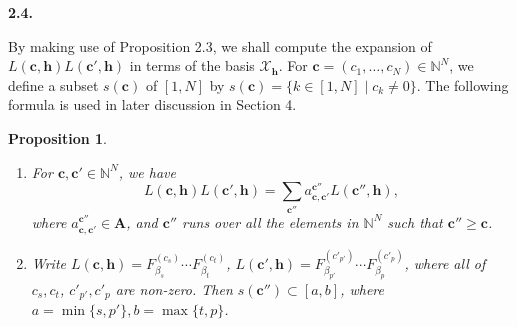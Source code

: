 \documentclass[12pt]{amsart}
\renewcommand\b{\beta}
\renewcommand{\1}{\mathbb 1}
\newcommand{\NN}{\mathbb N}
\newcommand\BA{\mathbf A}
\newcommand\Bh{\mathbf h}
\newcommand\Bc{\mathbf c}
\newcommand\SX{\mathscr{X}}
\numberwithin{equation}{section}
\newtheorem{prop}[thm]{Proposition}
\def \para#1{\par\medskip\textbf{#1}
              \addtocounter{thm}{1}}
\begin{document}
\para{2.4.} By making use of Proposition 2.3, we shall compute
the expansion of $L(\Bc, \Bh)L(\Bc',\Bh)$ in terms of the basis $\SX_{\Bh}$.
For $\Bc = (c_1, \dots, c_N) \in \NN^N$, we define a subset $s(\Bc)$ of $[1,N]$ by
$s(\Bc) = \{ k \in [1,N] \mid c_k \ne 0\}$.
The following formula is used in later discussion in Section 4.

\begin{prop}  %
\begin{enumerate}
\item 
For $\Bc, \Bc' \in \NN^N$, we have
\begin{equation*}
\tag{2.5.1}
  L(\Bc,\Bh)L(\Bc',\Bh) = \sum_{\Bc''}a_{\Bc,\Bc'}^{\Bc''}L(\Bc'',\Bh),
\end{equation*}
where $a_{\Bc,\Bc'}^{\Bc''} \in \BA$, and
$\Bc''$ runs over all the elements in $\NN^N$ such that $\Bc'' \ge \Bc$.
\item
Write $L(\Bc,\Bh) = F_{\b_s}^{(c_s)}\cdots F_{\b_t}^{(c_t)}$,
$L(\Bc',\Bh) = F_{\b_{p'}}^{(c'_{p'})}\cdots F_{\b_p}^{(c'_p)}$, where 
all of $c_s, c_t$, $c'_{p'}, c'_p$ are non-zero.    
Then $s(\Bc'') \subset [a, b]$, where $a = \min\{ s, p'\}, b = \max\{ t, p\}$.
\end{enumerate}  
\end{prop}
\end{document}
